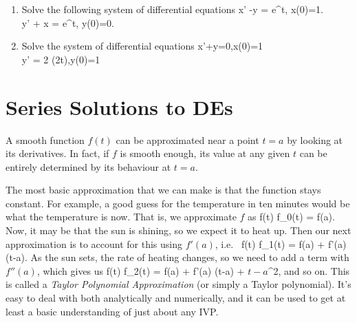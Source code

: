 \documentclass[12pt]{book}
\begin{document}
\begin{enumerate}
  \item
    Solve the following system of differential equations
    \bee
    x' -y = e^t, \qquad x(0)=1.
    \\
    y' + x = e^t, \qquad y(0)=0.
    \eee

    \item
      Solve the system of differential equations
      \bee
      x'+y=0,\qquad x(0)=1
      \\
      y' = 2 \cosh(2t),\qquad y(0)=1
      \eee

\end{enumerate}


\chapter{Series Solutions to DEs}

A smooth function $f(t)$ can be approximated near a point $t=a$ by looking
at its derivatives. In fact, if $f$ is smooth enough, its value at any
given $t$ can be entirely determined by its behaviour at $t=a$.

The most basic approximation that we can make is that the function stays
constant. For example, a good guess for the temperature in ten minutes would
be what the temperature is now. That is, we approximate $f$ as
\bee
f(t) \approx f_0(t) = f(a).
\eee
Now, it may be that the sun is shining, so we expect it to heat up. Then our
next approximation is to account for this using $f'(a)$, i.e.\
\bee
f(t) \approx f_1(t) = f(a) + f'(a) (t-a).
\eee
As the sun sets, the rate of heating changes, so we need to add a term with
$f''(a)$, which gives us
\bee
f(t) \approx f_2(t) = f(a) + f'(a) (t-a) + \(t-a\)^2,
\eee
and so on. This is called a \emph{Taylor Polynomial Approximation} (or simply a
Taylor polynomial). It's easy to deal with both analytically and numerically,
and it can be used to get at least a basic understanding of just about any IVP.
\end{document}
